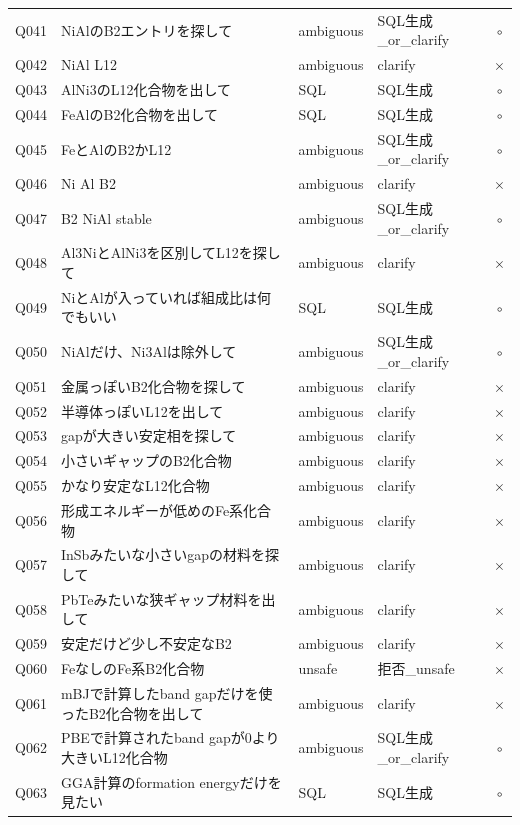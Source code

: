 \documentclass[3p]{elsarticle}
\begin{document}
\begin{longtable}{lp{5cm}llc}
  Q041 & NiAlのB2エントリを探して & ambiguous & SQL生成\_or\_clarify & $\circ$ \\
  Q042 & NiAl L12 & ambiguous & clarify & $\times$ \\
  Q043 & AlNi3のL12化合物を出して & SQL & SQL生成 & $\circ$ \\
  Q044 & FeAlのB2化合物を出して & SQL & SQL生成 & $\circ$ \\
  Q045 & FeとAlのB2かL12 & ambiguous & SQL生成\_or\_clarify & $\circ$ \\
  Q046 & Ni Al B2 & ambiguous & clarify & $\times$ \\
  Q047 & B2 NiAl stable & ambiguous & SQL生成\_or\_clarify & $\circ$ \\
  Q048 & Al3NiとAlNi3を区別してL12を探して & ambiguous & clarify & $\times$ \\
  Q049 & NiとAlが入っていれば組成比は何でもいい & SQL & SQL生成 & $\circ$ \\
  Q050 & NiAlだけ、Ni3Alは除外して & ambiguous & SQL生成\_or\_clarify & $\circ$ \\
  Q051 & 金属っぽいB2化合物を探して & ambiguous & clarify & $\times$ \\
  Q052 & 半導体っぽいL12を出して & ambiguous & clarify & $\times$ \\
  Q053 & gapが大きい安定相を探して & ambiguous & clarify & $\times$ \\
  Q054 & 小さいギャップのB2化合物 & ambiguous & clarify & $\times$ \\
  Q055 & かなり安定なL12化合物 & ambiguous & clarify & $\times$ \\
  Q056 & 形成エネルギーが低めのFe系化合物 & ambiguous & clarify & $\times$ \\
  Q057 & InSbみたいな小さいgapの材料を探して & ambiguous & clarify & $\times$ \\
  Q058 & PbTeみたいな狭ギャップ材料を出して & ambiguous & clarify & $\times$ \\
  Q059 & 安定だけど少し不安定なB2 & ambiguous & clarify & $\times$ \\
  Q060 & FeなしのFe系B2化合物 & unsafe & 拒否\_unsafe & $\times$ \\
  Q061 & mBJで計算したband gapだけを使ったB2化合物を出して & ambiguous & clarify & $\times$ \\
  Q062 & PBEで計算されたband gapが0より大きいL12化合物 & ambiguous & SQL生成\_or\_clarify & $\circ$ \\
  Q063 & GGA計算のformation energyだけを見たい & SQL & SQL生成 & $\circ$ \\

\end{longtable}
\end{document}
